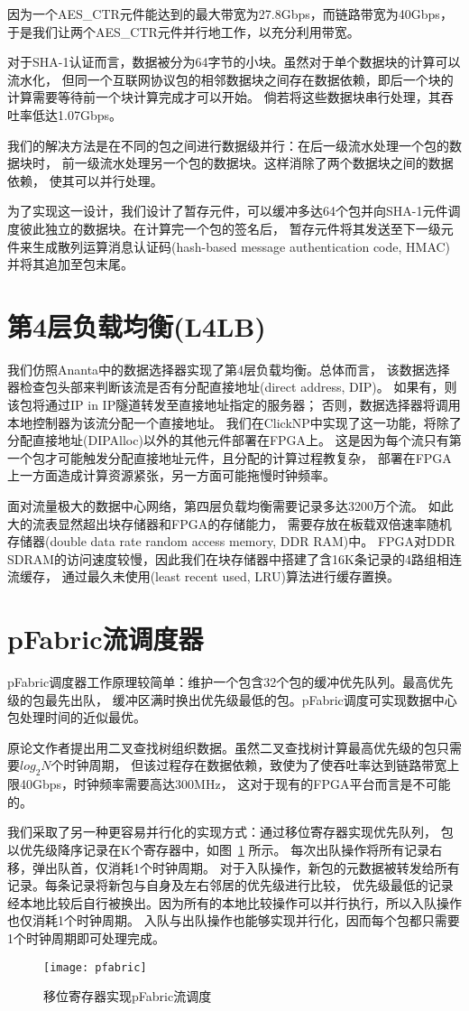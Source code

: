 因为一个AES\_CTR元件能达到的最大带宽为27.8Gbps，而链路带宽为40Gbps，
于是我们让两个AES\_CTR元件并行地工作，以充分利用带宽。

对于SHA-1认证而言，数据被分为64字节的小块。虽然对于单个数据块的计算可以流水化，
但同一个互联网协议包的相邻数据块之间存在数据依赖，即后一个块的计算需要等待前一个块计算完成才可以开始。
倘若将这些数据块串行处理，其吞吐率低达1.07Gbps。

我们的解决方法是在不同的包之间进行数据级并行：在后一级流水处理一个包的数据块时，
前一级流水处理另一个包的数据块。这样消除了两个数据块之间的数据依赖，
使其可以并行处理。

为了实现这一设计，我们设计了暂存元件，可以缓冲多达64个包并向SHA-1元件调度彼此独立的数据块。在计算完一个包的签名后，
暂存元件将其发送至下一级元件来生成散列运算消息认证码(hash-based message authentication code, HMAC)并将其追加至包末尾。

\section{第4层负载均衡(L4LB)}
我们仿照Ananta中的数据选择器实现了第4层负载均衡。总体而言，
该数据选择器检查包头部来判断该流是否有分配直接地址(direct address, DIP)。
如果有，则该包将通过IP in IP隧道转发至直接地址指定的服务器；
否则，数据选择器将调用本地控制器为该流分配一个直接地址。
我们在ClickNP中实现了这一功能，将除了分配直接地址(DIPAlloc)以外的其他元件部署在FPGA上。
这是因为每个流只有第一个包才可能触发分配直接地址元件，且分配的计算过程教复杂，
部署在FPGA上一方面造成计算资源紧张，另一方面可能拖慢时钟频率。

面对流量极大的数据中心网络，第四层负载均衡需要记录多达3200万个流。
如此大的流表显然超出块存储器和FPGA的存储能力，
需要存放在板载双倍速率随机存储器(double data rate random access memory, DDR RAM)中。
FPGA对DDR SDRAM的访问速度较慢，因此我们在块存储器中搭建了含16K条记录的4路组相连流缓存，
通过最久未使用(least recent used, LRU)算法进行缓存置换。

\section{pFabric流调度器}
pFabric调度器工作原理较简单：维护一个包含32个包的缓冲优先队列。最高优先级的包最先出队，
缓冲区满时换出优先级最低的包。pFabric调度可实现数据中心包处理时间的近似最优。

原论文作者提出用二叉查找树组织数据。虽然二叉查找树计算最高优先级的包只需要$log_2N$个时钟周期，
但该过程存在数据依赖，致使为了使吞吐率达到链路带宽上限40Gbps，时钟频率需要高达300MHz，
这对于现有的FPGA平台而言是不可能的。

我们采取了另一种更容易并行化的实现方式：通过移位寄存器实现优先队列，
包以优先级降序记录在K个寄存器中，如图~\ref{fig:pfabric} 所示。
每次出队操作将所有记录右移，弹出队首，仅消耗1个时钟周期。
对于入队操作，新包的元数据被转发给所有记录。每条记录将新包与自身及左右邻居的优先级进行比较，
优先级最低的记录经本地比较后自行被换出。因为所有的本地比较操作可以并行执行，所以入队操作也仅消耗1个时钟周期。
入队与出队操作也能够实现并行化，因而每个包都只需要1个时钟周期即可处理完成。
\begin{figure}[htbp]
\centering
\texttt{[image: pfabric]}
\caption{移位寄存器实现pFabric流调度} \label{fig:pfabric}
\end{figure}
